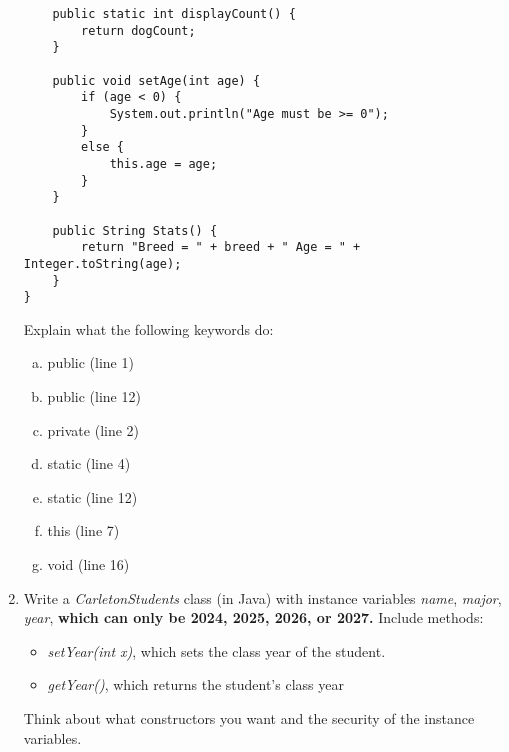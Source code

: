 \documentclass[letter]{article}
\begin{document}
\begin{enumerate}[1.]
\begin{lstlisting}
    public static int displayCount() {
        return dogCount;
    }

    public void setAge(int age) {
        if (age < 0) {
            System.out.println("Age must be >= 0");
        }
        else {
            this.age = age;
        }
    }

    public String Stats() {
        return "Breed = " + breed + " Age = " + Integer.toString(age);
    }       
}
    \end{lstlisting} Explain what the following keywords do:
    \begin{enumerate}[a)]
    	\item public (line 1)
            \item public (line 12)
    	\item private (line 2)
    	\item static (line 4)
            \item static (line 12)
            \item this (line 7)
            \item void (line 16)
    \end{enumerate}

    \item Write a \textit{CarletonStudents} class (in Java) with instance variables \textit{name}, \textit{major}, \textit{year}, \textbf{which can only be 2024, 2025, 2026, or 2027.} Include methods:
    \begin{itemize}
        \item \textit{setYear(int x)}, which sets the class year of the student. 
        \item \textit{getYear()}, which returns the student's class year
    \end{itemize}
    
     Think about what constructors you want and the security of the instance variables.
    

    
\end{enumerate}
\end{document}
